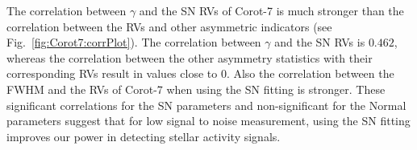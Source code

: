 \documentclass[11pt, oneside]{article}
\begin{document}
The correlation between $\gamma$ and the SN RVs of Corot-7 is much stronger than the correlation between  the RVs and other asymmetric indicators (see Fig.~\ref{fig:Corot7:corrPlot}). The correlation between $\gamma$ and the SN RVs is $0.462$, whereas the correlation between the other asymmetry statistics with their corresponding RVs result in values close to $0$. Also the correlation between the FWHM and the RVs of Corot-7 when using the SN fitting is stronger. These significant correlations for the SN parameters and non-significant for the Normal parameters suggest that for low signal to noise measurement, using the SN fitting improves our power in detecting stellar activity signals. 
\fi


%


\end{document}
